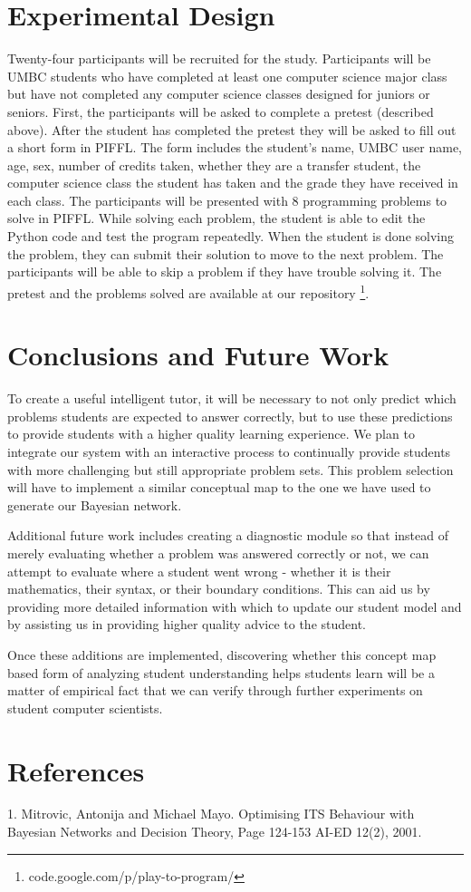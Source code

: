 \documentclass[twocolumn]{article}
\begin{document}
\section{Experimental Design}
\label{sec:exper-design}

Twenty-four participants will be recruited for the study. Participants will be UMBC students who have completed at least one computer science major class but have not completed any computer science classes designed for juniors or seniors.
First, the participants will be asked to complete a pretest (described above). After the student has completed the pretest they will be asked to fill out a short form in PIFFL. The form includes the student’s name, UMBC user name, age, sex, number of credits taken, whether they are a transfer student, the computer science class the student has taken and the grade they have received in each class. The participants will be presented with 8 programming problems to solve in PIFFL. While solving each problem, the student is able to edit the Python code and test the program repeatedly. When the student is done solving the problem, they can submit their solution to move to the next problem.  The participants will be able to skip a problem if they have trouble solving it.  The pretest and the problems solved are available at our repository \footnote[2]{code.google.com/p/play-to-program/}.

\section{Conclusions and Future Work}
\label{conclusions}


  To create a useful intelligent tutor, it will be necessary to not only predict which problems students are expected to answer correctly, but to use these predictions to provide students with a higher quality learning experience.  We plan to integrate our system with an interactive process to continually provide students with more challenging but still appropriate problem sets.  This problem selection will have to implement a similar conceptual map to the one we have used to generate our Bayesian network.

 Additional future work includes creating a diagnostic module so that instead of merely evaluating whether a problem was answered correctly or not, we can attempt to evaluate where a student went wrong - whether it is their mathematics, their syntax, or their boundary conditions.  This can aid us by providing more detailed information with which to update our student model and by assisting us in providing higher quality advice to the student.

Once these additions are implemented, discovering whether this concept map based form of analyzing student understanding helps students learn will be a matter of empirical fact that we can verify through further experiments on student computer scientists.
  
\section*{References}

1. Mitrovic, Antonija and Michael Mayo. Optimising ITS Behaviour with Bayesian Networks and Decision Theory, Page 124-153 AI-ED 12(2), 2001.
\end{document}
